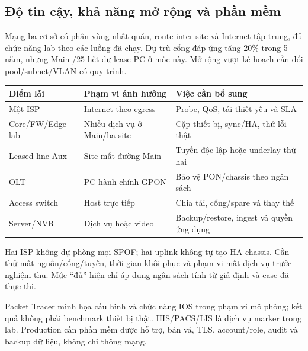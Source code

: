 \documentclass[
  11pt,
]{article}
\begin{document}
\subsection{Độ tin cậy, khả năng mở rộng và phần mềm}
Mạng ba cơ sở có phân vùng nhất quán, route inter-site và Internet tập trung, đủ chức năng lab theo các luồng đã chạy. Dự trù cổng đáp ứng tăng 20\% trong 5 năm, nhưng Main /25 hết dư lease PC ở mốc này. Mở rộng vượt kế hoạch cần đổi pool/subnet/VLAN có quy trình.
\par\noindent
{}
\begin{tabularx}{\linewidth}{@{}lXX@{}}\toprule
Điểm lỗi & Phạm vi ảnh hưởng & Việc cần bổ sung\\\midrule
Một ISP & Internet theo egress & Probe, QoS, tải thiết yếu và SLA\\
Core/FW/Edge lab & Nhiều dịch vụ ở Main/ba site & Cặp thiết bị, sync/HA, thử lỗi thật\\
Leased line Aux & Site mất đường Main & Tuyến độc lập hoặc underlay thứ hai\\
OLT & PC hành chính GPON & Bảo vệ PON/chassis theo ngân sách\\
Access switch & Host trực tiếp & Chia tải, cổng/spare và thay thế\\
Server/NVR & Dịch vụ hoặc video & Backup/restore, ingest và quyền ứng dụng\\\bottomrule\end{tabularx}\par

Hai ISP không dự phòng mọi SPOF; hai uplink không tự tạo HA chassis. Cần thử mất nguồn/cổng/tuyến, thời gian khôi phục và phạm vi mất dịch vụ trước nghiệm thu. Mức ``đủ'' hiện chỉ áp dụng ngân sách tính từ giả định và case đã thực thi.

Packet Tracer minh họa cấu hình và chức năng IOS trong phạm vi mô phỏng; kết quả không phải benchmark thiết bị thật. HIS/PACS/LIS là dịch vụ marker trong lab. Production cần phần mềm được hỗ trợ, bản vá, TLS, account/role, audit và backup dữ liệu, không chỉ thông mạng.

\clearpage
\end{document}
